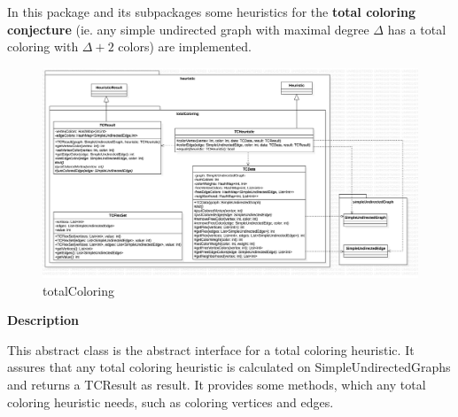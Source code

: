 	
	
	
	
	In this package and its subpackages some heuristics for the \textbf{total coloring conjecture} (ie. any simple undirected graph with maximal degree $\Delta$ has a total coloring with $\Delta + 2$ colors) are implemented.
	
	
		\begin{figure}
	\centering
\includegraphics[width=\textwidth]{abbildungen/tc.png}

	\caption{ totalColoring}
	\label{img:tc}
\end{figure}
	
	
	\textbf{Description}
	
	This abstract class is the abstract interface for a total coloring heuristic. It assures that any total coloring heuristic is calculated on SimpleUndirectedGraphs and returns a TCResult as result. It provides some methods, which any total coloring heuristic needs, such as coloring vertices and edges.
	
